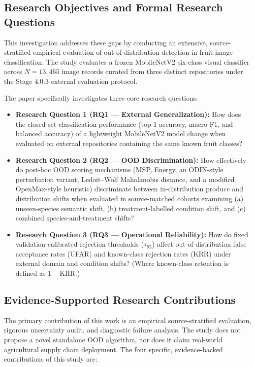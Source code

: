 \subsection{Research Objectives and Formal Research Questions}
\label{sec:research_questions}
This investigation addresses these gaps by conducting an extensive, source-stratified empirical evaluation of out-of-distribution detection in fruit image classification. The study evaluates a frozen MobileNetV2 six-class visual classifier across $N = 13,465$ image records curated from three distinct repositories under the Stage 4.0.3 external evaluation protocol. 

The paper specifically investigates three core research questions:
\begin{itemize}
\item \textbf{Research Question 1 (RQ1 --- External Generalization):} How does the closed-set classification performance (top-1 accuracy, macro-F1, and balanced accuracy) of a lightweight MobileNetV2 model change when evaluated on external repositories containing the same known fruit classes?
\item \textbf{Research Question 2 (RQ2 --- OOD Discrimination):} How effectively do post-hoc OOD scoring mechanisms (MSP, Energy, an ODIN-style perturbation variant, Ledoit--Wolf Mahalanobis distance, and a modified OpenMax-style heuristic) discriminate between in-distribution produce and distribution shifts when evaluated in source-matched cohorts examining (a) unseen-species semantic shift, (b) treatment-labelled condition shift, and (c) combined species-and-treatment shifts?
\item \textbf{Research Question 3 (RQ3 --- Operational Reliability):} How do fixed validation-calibrated rejection thresholds ($\tau_{95}$) affect out-of-distribution false acceptance rates (UFAR) and known-class rejection rates (KRR) under external domain and condition shifts? (Where known-class retention is defined as $1 - \text{KRR}$.)
\end{itemize}

\subsection{Evidence-Supported Research Contributions}
\label{sec:contributions}
The primary contribution of this work is an empirical source-stratified evaluation, rigorous uncertainty audit, and diagnostic failure analysis. The study does not propose a novel standalone OOD algorithm, nor does it claim real-world agricultural supply chain deployment. The four specific, evidence-backed contributions of this study are:

